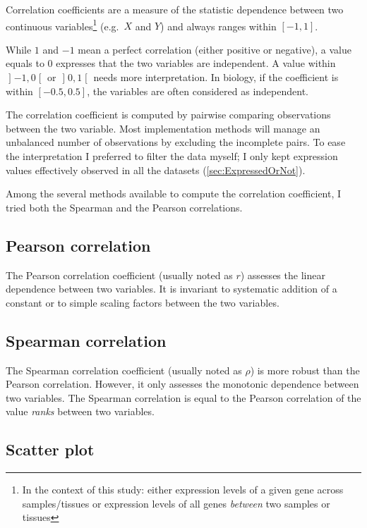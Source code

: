 
Correlation coefficients are a measure of the statistic dependence between two
continuous variables\footnote{In the context of this study: either expression
levels of a given gene across samples/tissues or expression levels of all genes
\emph{between} two samples or tissues} (e.g.\
$X$ and $Y$) and always ranges within $[-1,1]$.

While $1$ and $-1$ mean a perfect correlation (either positive or negative),
a value equals to $0$ expresses that the two variables are independent.
A value within $\mathopen]-1,0\mathclose[$
or $\mathopen]0,1\mathclose[$ needs more interpretation. In biology, if the
coefficient is within $[-0.5,0.5]$, the variables are often considered as
independent.

The correlation coefficient is computed by pairwise comparing observations
between the two variable. Most implementation methods
will manage an unbalanced number of observations by excluding the incomplete pairs.
To ease the interpretation I preferred to filter the data \latin{a priori}
myself; I only kept expression values effectively observed in all the datasets
(\cref{sec:ExpressedOrNot}).

Among the several methods available to compute the correlation coefficient, I
tried both the Spearman and the Pearson correlations.

\subsection{Pearson correlation}
The Pearson correlation coefficient (usually noted as $r$) assesses the linear
dependence between two variables. It is invariant to systematic addition of a
constant or to simple scaling factors between the two variables.

\subsection{Spearman correlation}
The Spearman correlation coefficient (usually noted as $\rho$)
is more robust than the Pearson correlation.
However, it only assesses the monotonic dependence between two variables.
The Spearman correlation is equal to the Pearson correlation of the value
\emph{ranks} between two variables.


\subsection{Scatter plot}

